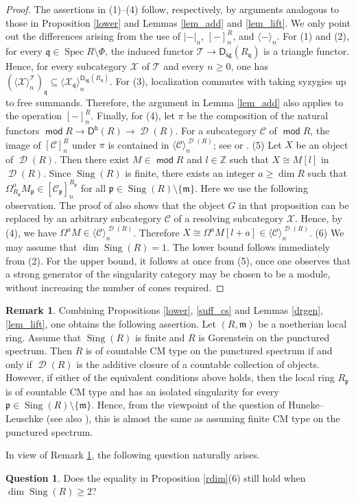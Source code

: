 \documentclass[10pt]{amsart}
\theoremstyle{definition}
\newtheorem{ques}[thm]{Question}
\newtheorem{rem}[thm]{Remark}
\theoremstyle{remark}
\numberwithin{equation}{thm}
\def\C{\mathcal{C}}
\def\d{\operatorname{\mathscr{D}}}
\def\db{\operatorname{\mathsf{D^b}}}
\def\dim{\operatorname{dim}}
\def\ds{\operatorname{\mathsf{D_{sg}}}}
\def\ge{\geqslant}
\def\m{\mathfrak{m}}
\def\mod{\operatorname{\mathsf{mod}}}
\def\p{\mathfrak{p}}
\def\q{\mathfrak{q}}
\def\Sing{\operatorname{Sing}}
\def\Spec{\operatorname{Spec}}
\def\T{\mathcal{T}}
\def\X{\mathcal{X}}
\begin{document}
\begin{proof}
The assertions in (1)--(4) follow, respectively, by arguments analogous to those in Proposition \ref{lower} and Lemmas \ref{lem_add} and \ref{lem_lift}. 
We only point out the differences arising from the use of ${|-|}_{n}$, ${[-]}^{R}_{n}$, and ${\langle-\rangle}_{n}$.
For (1) and (2), for every $\q\in\Spec R\setminus\Phi$, the induced functor $\T\to\ds(R_{\q})$ is a triangle functor.
Hence, for every subcategory $\X$ of $\T$ and every $n\ge 0$, one has $({\langle\X\rangle}^{\T}_{n})_{\q}\subseteq{\langle\X_{\q}\rangle}^{\ds(R_{\q})}_{n}$.
For (3), localization commutes with taking syzygies up to free summands.
Therefore, the argument in Lemma \ref{lem_add} also applies to the operation ${[-]}^{R}_{n}$. 
Finally, for (4), let $\pi$ be the composition of the natural functors $\mod R\to\db(R)\to\d(R)$.
For a subcategory $\C$ of $\mod R$, the image of ${[\C]}^{R}_{n}$ under $\pi$ is contained in ${\langle\C\rangle}^{\d(R)}_{n}$; see \cite[Lemma 2.4]{DT2015b} or \cite[Lemma 3.9]{MT}.
(5) Let $X$ be an object of $\d(R)$. 
Then there exist $M \in \mod R$ and $l \in \mathbb{Z}$ such that $X \cong M[l]$ in $\d(R)$. 
Since $\Sing(R)$ is finite, there exists an integer $a \geq \dim R$ such that $\Omega_{R_{\p}}^{a} M_{\p} \in [\C_{\p}]_{n}^{R_{\p}}$ for all $\p \in \Sing(R) \setminus \{\m\}$. 
Here we use the following observation. 
The proof of \cite[Proposition 5.3]{BSTT} also shows that the object $G$ in that proposition can be replaced by an arbitrary subcategory $\C$ of a resolving subcategory $\X$.
Hence, by (4), we have $\Omega^{a}M \in {\langle \C \rangle}_{n}^{\d(R)}$.
Therefore $X \cong \Omega^{a}M[l+a] \in {\langle \C \rangle}_{n}^{\d(R)}$.
(6) We may assume that $\dim\Sing(R)=1$.
The lower bound follows immediately from (2). 
For the upper bound, it follows at once from (5), once one observes that a strong generator of the singularity category may be chosen to be a module, without increasing the number of cones required.
\end{proof}
\begin{rem}\label{rmk_cont}
Combining Propositions \ref{lower}, \ref{suff_cs} and Lemmas \ref{drgen}, \ref{lem_lift}, one obtains the following assertion.
Let $(R,\m)$ be a noetherian local ring. 
Assume that $\Sing(R)$ is finite and $R$ is Gorenstein on the punctured spectrum.
Then $R$ is of countable CM type on the punctured spectrum if and only if $\d(R)$ is the additive closure of a countable collection of objects.
However, if either of the equivalent conditions above holds, then the local ring $R_{\p}$ is of countable CM type and has an isolated singularity for every $\p \in \Sing(R) \setminus \{\m\}$.
Hence, from the viewpoint of the question of Huneke--Leuschke \cite{HL2003} (see also \cite{S2014}), this is almost the same as assuming finite CM type on the punctured spectrum.
\end{rem}
In view of Remark \ref{rmk_cont}, the following question naturally arises.
\begin{ques}
Does the equality in Proposition \ref{rdim}(6) still hold when $\dim\Sing(R)\ge 2$?
\end{ques}
\end{document}
